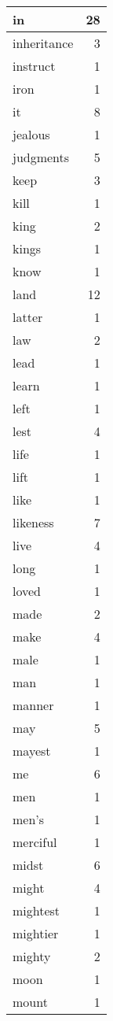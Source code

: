 \begin{center}
\begin{longtable}{l|r}
in & 28 \\ \hline
inheritance & 3 \\ \hline
instruct & 1 \\ \hline
iron & 1 \\ \hline
it & 8 \\ \hline
jealous & 1 \\ \hline
judgments & 5 \\ \hline
keep & 3 \\ \hline
kill & 1 \\ \hline
king & 2 \\ \hline
kings & 1 \\ \hline
know & 1 \\ \hline
land & 12 \\ \hline
latter & 1 \\ \hline
law & 2 \\ \hline
lead & 1 \\ \hline
learn & 1 \\ \hline
left & 1 \\ \hline
lest & 4 \\ \hline
life & 1 \\ \hline
lift & 1 \\ \hline
like & 1 \\ \hline
likeness & 7 \\ \hline
live & 4 \\ \hline
long & 1 \\ \hline
loved & 1 \\ \hline
made & 2 \\ \hline
make & 4 \\ \hline
male & 1 \\ \hline
man & 1 \\ \hline
manner & 1 \\ \hline
may & 5 \\ \hline
mayest & 1 \\ \hline
me & 6 \\ \hline
men & 1 \\ \hline
men's & 1 \\ \hline
merciful & 1 \\ \hline
midst & 6 \\ \hline
might & 4 \\ \hline
mightest & 1 \\ \hline
mightier & 1 \\ \hline
mighty & 2 \\ \hline
moon & 1 \\ \hline
mount & 1 \\ \hline

\end{longtable}
\end{center}
